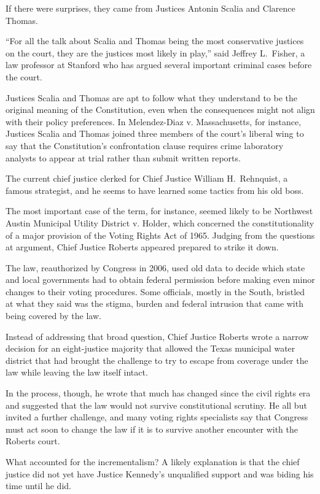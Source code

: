 ﻿\documentclass[12pt]{article}
\begin{document}
If there were surprises, they came from Justices Antonin Scalia and Clarence Thomas.

``For all the talk about Scalia and Thomas being the most conservative justices on the court, they
are the justices most likely in play,'' said Jeffrey L.~Fisher, a law professor at Stanford who has
argued several important criminal cases before the court.

Justices Scalia and Thomas are apt to follow what they understand to be the original meaning of the
Constitution, even when the consequences might not align with their policy preferences. In
Melendez-Diaz v. Massachusetts, for instance, Justices Scalia and Thomas joined three members of the
court's liberal wing to say that the Constitution's confrontation clause requires crime laboratory
analysts to appear at trial rather than submit written reports.

The current chief justice clerked for Chief Justice William H.~Rehnquist, a famous strategist, and
he seems to have learned some tactics from his old boss.

The most important case of the term, for instance, seemed likely to be Northwest Austin Municipal
Utility District v. Holder, which concerned the constitutionality of a major provision of the Voting
Rights Act of 1965. Judging from the questions at argument, Chief Justice Roberts appeared prepared
to strike it down.

The law, reauthorized by Congress in 2006, used old data to decide which state and local governments
had to obtain federal permission before making even minor changes to their voting procedures. Some
officials, mostly in the South, bristled at what they said was the stigma, burden and federal
intrusion that came with being covered by the law.

Instead of addressing that broad question, Chief Justice Roberts wrote a narrow decision for an
eight-justice majority that allowed the Texas municipal water district that had brought the
challenge to try to escape from coverage under the law while leaving the law itself intact.

In the process, though, he wrote that much has changed since the civil rights era and suggested that
the law would not survive constitutional scrutiny. He all but invited a further challenge, and many
voting rights specialists say that Congress must act soon to change the law if it is to survive
another encounter with the Roberts court.

What accounted for the incrementalism? A likely explanation is that the chief justice did not yet
have Justice Kennedy's unqualified support and was biding his time until he did.
\end{document}
